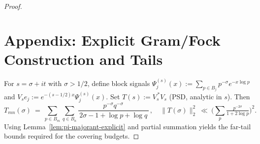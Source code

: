 \documentclass[11pt]{article}
\theoremstyle{definition}
\theoremstyle{remark}
\begin{document}
\begin{proof}
\medskip
\section*{Appendix: Explicit Gram/Fock Construction and Tails}\label{sec:appendix}
For $s=\sigma+it$ with $\sigma>1/2$, define block signals $\Psi_j^{(s)}(x):=\sum_{p\in B_j} p^{-\sigma}e^{-x\log p}$ and $V_s e_j:= e^{-(s-1/2)x}\Psi_j^{(s)}(x)$. Set $T(s):=V_s^{\,*}V_s$ (PSD, analytic in $s$). Then
\[
T_{mn}(\sigma)\ =\ \sum_{p\in B_m}\sum_{q\in B_n}\frac{p^{-\sigma}q^{-\sigma}}{\,2\sigma-1+\log p+\log q\,}\,,\quad \|T(\sigma)\|_2^2\ \ll\ \Big(\sum_p \tfrac{p^{-2\sigma}}{1+2\log p}\Big)^2.
\]
Using Lemma~\ref{lem:pi-majorant-explicit} and partial summation yields the far-tail bounds required for the covering budgets.

\iffalse %
\clearpage


\clearpage


\clearpage


\clearpage


\clearpage

\fi %

\clearpage


\clearpage


\clearpage


\clearpage


\clearpage


\clearpage


\clearpage

\clearpage



\end{proof}
\end{document}
